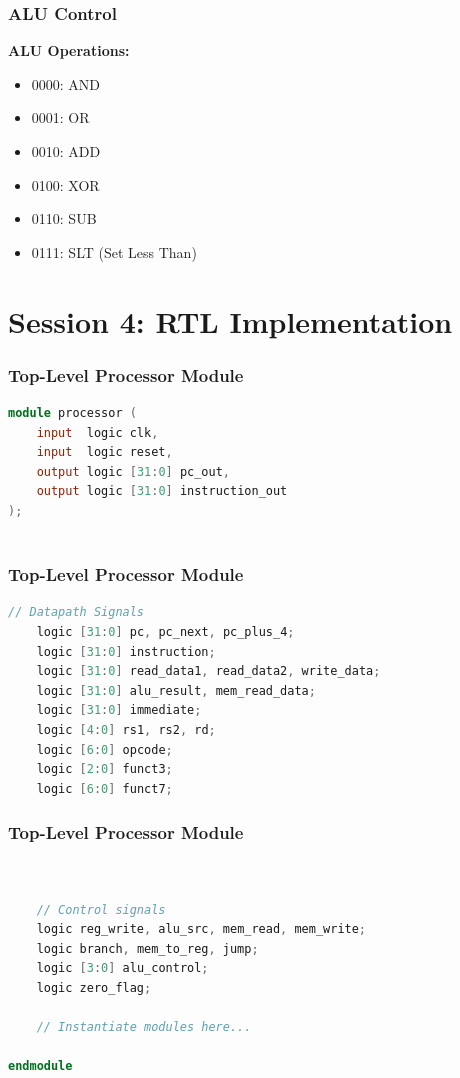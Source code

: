 \documentclass[aspectratio=169,xcolor=dvipsnames]{beamer}
\begin{document}
\begin{frame}
\frametitle{ALU Control}
\textbf{ALU Operations:}
\begin{itemize}
    \item 0000: AND
    \item 0001: OR
    \item 0010: ADD
    \item 0100: XOR
    \item 0110: SUB
    \item 0111: SLT (Set Less Than)
\end{itemize}
\end{frame}

\section{Session 4: RTL Implementation}

\begin{frame}[fragile]
\frametitle{Top-Level Processor Module}
\begin{lstlisting}[language=Verilog]
module processor (
    input  logic clk,
    input  logic reset,
    output logic [31:0] pc_out,
    output logic [31:0] instruction_out
);
    
\end{lstlisting}
\end{frame}

\begin{frame}[fragile]
\frametitle{Top-Level Processor Module}
\begin{lstlisting}[language=Verilog]
    // Datapath Signals    
    logic [31:0] pc, pc_next, pc_plus_4;
    logic [31:0] instruction;
    logic [31:0] read_data1, read_data2, write_data;
    logic [31:0] alu_result, mem_read_data;
    logic [31:0] immediate;
    logic [4:0] rs1, rs2, rd;
    logic [6:0] opcode;
    logic [2:0] funct3;
    logic [6:0] funct7;
\end{lstlisting}
\end{frame}

\begin{frame}[fragile]
\frametitle{Top-Level Processor Module}
\begin{lstlisting}[language=Verilog]
    
    
    // Control signals
    logic reg_write, alu_src, mem_read, mem_write;
    logic branch, mem_to_reg, jump;
    logic [3:0] alu_control;
    logic zero_flag;
    
    // Instantiate modules here...
    
endmodule
\end{lstlisting}
\end{frame}
\end{document}
